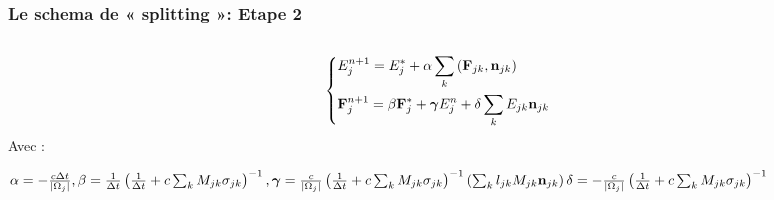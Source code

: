 \documentclass[xcolor=dvipsnames]{beamer} %
\newcommand{\bvec}[1]{\mathbf{#1}}
\begin{document}
\begin{frame}
  \frametitle{Le schema de « splitting »: Etape 2}   %
  \begin{columns}
    \begin{column}{0.6\textwidth}
      \begingroup
      \normalsize
      \begin{equation*} 
          \begin{dcases}
          E_j^{n+1} = E_j^* + \alpha \sum_k \left( \bvec F_{jk}, \bvec n_{jk} \right) \\
          \bvec F_j^{n+1} = \beta \bvec F_j^* + \bm{\gamma} E_j^n + \delta \sum_k E_{jk} \bvec n_{jk}
          \end{dcases}   
      \end{equation*}
      Avec :
      \scriptsize
    
        $\alpha = -\frac{c \Delta t}{\left| \Omega_j \right|}, \linebreak
        \beta = \frac{1}{\Delta t} \left( \frac{1}{\Delta t} + c \sum_k M_{jk} \sigma_{jk} \right)^{-1}, \linebreak
        \bm{\gamma} = \frac{c}{\left| \Omega_j \right|} \left( \frac{1}{\Delta t} + c \sum_k M_{jk} \sigma_{jk} \right)^{-1} \left( \sum_k l_{jk} M_{jk} \bvec n_{jk} \right) \linebreak
        \delta = -\frac{c}{\left| \Omega_j \right|} \left( \frac{1}{\Delta t} + c \sum_k M_{jk} \sigma_{jk} \right)^{-1}$

    \endgroup
      

\end{column}
\end{columns}
\end{frame}
\end{document}
